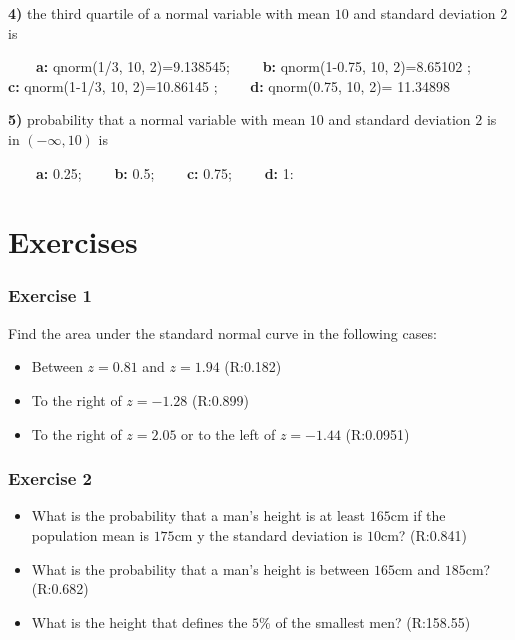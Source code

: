 \documentclass[
]{book}
\providecommand{\tightlist}{%
  \setlength{\itemsep}{0pt}\setlength{\parskip}{0pt}}
\begin{document}
\textbf{4)} the third quartile of a normal variable with mean \(10\) and standard deviation \(2\) is

\textbf{\(\qquad\)a:} qnorm(1/3, 10, 2)=9.138545;
\textbf{\(\qquad\)b:} qnorm(1-0.75, 10, 2)=8.65102 ;
\textbf{\(\qquad\)c:} qnorm(1-1/3, 10, 2)=10.86145 ;
\textbf{\(\qquad\)d:} qnorm(0.75, 10, 2)= 11.34898

\textbf{5)} probability that a normal variable with mean \(10\) and standard deviation \(2\) is in \((-\infty,10)\) is

\textbf{\(\qquad\)a:} 0.25;
\textbf{\(\qquad\)b:} 0.5;
\textbf{\(\qquad\)c:} 0.75;
\textbf{\(\qquad\)d:} 1:

\hypertarget{exercises-7}{%
\section{Exercises}\label{exercises-7}}

\hypertarget{exercise-1-6}{%
\subsubsection{Exercise 1}\label{exercise-1-6}}

Find the area under the standard normal curve in the following cases:

\begin{itemize}
\tightlist
\item
  Between \(z=0.81\) and \(z=1.94\) (R:0.182)
\item
  To the right of \(z=-1.28\) (R:0.899)
\item
  To the right of \(z=2.05\) or to the left of \(z=-1.44\) (R:0.0951)
\end{itemize}

\hypertarget{exercise-2-6}{%
\subsubsection{Exercise 2}\label{exercise-2-6}}

\begin{itemize}
\item
  What is the probability that a man's height is at least
  \(165\)cm if the population mean is \(175\)cm y the standard deviation is \(10\)cm? (R:0.841)
\item
  What is the probability that a man's height is between
  \(165\)cm and \(185\)cm? (R:0.682)
\item
  What is the height that defines the \(5\%\) of the smallest men? (R:158.55)
\end{itemize}
\end{document}
